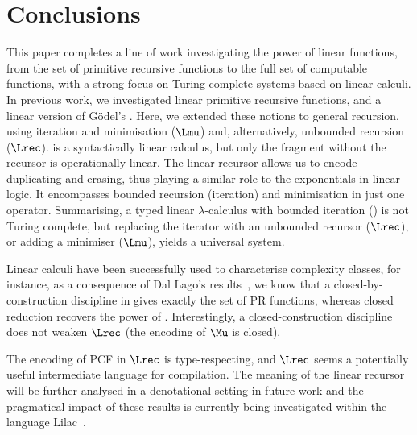 \documentclass{article}
\begin{document}
\section{Conclusions}\label{sec:conc}
This paper completes a line of work investigating
the power of linear functions, from the set of primitive recursive
functions to the full set of computable functions, with a strong focus
on Turing complete systems based on linear calculi. In
previous work, we  investigated linear primitive recursive functions, and a
linear version of G\"odel's \ST. Here, we extended these notions to general
recursion, using iteration and minimisation ($\Lmu$) and, alternatively,
unbounded recursion ($\Lrec$).  \LLCIrec is a syntactically linear
calculus, but only the fragment without the recursor is operationally
linear.  The linear recursor allows us to encode duplicating and
erasing, thus playing a similar role to the exponentials in linear
logic. It encompasses bounded recursion (iteration) and minimisation
in just one operator.
Summarising, a typed linear $\lambda$-calculus
with bounded iteration (\LLCI) is not Turing complete, but replacing
the iterator with an unbounded recursor ($\Lrec$), or adding a
minimiser ($\Lmu$), yields a universal system.

Linear calculi have been successfully used to characterise complexity
classes, for instance, as a consequence of Dal Lago's
results~\cite{Lago05}, we know that a closed-by-construction
discipline in \LLCI gives exactly the set of PR functions, whereas
closed reduction recovers the power of \ST. Interestingly, a
closed-construction discipline does not weaken $\Lrec$ (the encoding
of $\Mu$ is closed).

The encoding of PCF in $\Lrec$ is type-respecting, and $\Lrec$ seems a
potentially useful intermediate language for compilation. The meaning of the linear recursor will be
further analysed in a denotational setting in future work and the
pragmatical impact of these results is currently being investigated
within the language Lilac~\cite{MackieIC:lilfpl}. 









\label{sect:bib}
\end{document}

